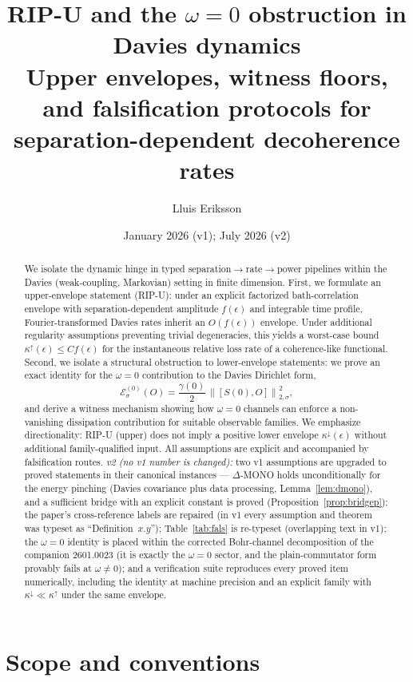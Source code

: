 \documentclass[11pt]{article}
\title{RIP-U and the $\omega = 0$ obstruction in Davies dynamics\\
\large Upper envelopes, witness floors, and falsification protocols for
separation-dependent decoherence rates}
\author{Lluis Eriksson}
\date{January 2026 (v1); July 2026 (v2)}
\theoremstyle{definition}
\theoremstyle{remark}
\begin{document}
\maketitle

\begin{abstract}
We isolate the dynamic hinge in typed separation$\to$rate$\to$power
pipelines within the Davies (weak-coupling, Markovian) setting in finite
dimension. First, we formulate an upper-envelope statement (RIP-U): under
an explicit factorized bath-correlation envelope with
separation-dependent amplitude $f(\epsilon)$ and integrable time profile,
Fourier-transformed Davies rates inherit an $O(f(\epsilon))$ envelope.
Under additional regularity assumptions preventing trivial degeneracies,
this yields a worst-case bound $\kappa^{\uparrow}(\epsilon) \le
Cf(\epsilon)$ for the instantaneous relative loss rate of a coherence-like
functional. Second, we isolate a structural obstruction to lower-envelope
statements: we prove an exact identity for the $\omega = 0$ contribution
to the Davies Dirichlet form,
\[
\mathcal{E}^{(0)}_{\sigma}(O) = \frac{\gamma(0)}{2}\,
\left\| [S(0), O] \right\|_{2,\sigma}^{2},
\]
and derive a witness mechanism showing how $\omega = 0$ channels can
enforce a non-vanishing dissipation contribution for suitable observable
families. We emphasize directionality: RIP-U (upper) does not imply a
positive lower envelope $\kappa^{\downarrow}(\epsilon)$ without additional
family-qualified input. All assumptions are explicit and accompanied by
falsification routes. \emph{v2 (no v1 number is changed):} two v1
assumptions are upgraded to proved statements in their canonical
instances --- $\Delta$-MONO holds unconditionally for the energy pinching
(Davies covariance plus data processing, Lemma~\ref{lem:dmono}), and a
sufficient bridge with an explicit constant is proved
(Proposition~\ref{prop:bridgep}); the paper's cross-reference labels are
repaired (in v1 every assumption and theorem was typeset as
``Definition~$x.y$''); Table~\ref{tab:fals} is re-typeset (overlapping
text in v1); the $\omega=0$ identity is placed within the corrected
Bohr-channel decomposition of the companion 2601.0023 (it is exactly the
$\omega=0$ sector, and the plain-commutator form provably fails at
$\omega \ne 0$); and a verification suite reproduces every proved item
numerically, including the identity at machine precision and an explicit
family with $\kappa^{\downarrow} \ll \kappa^{\uparrow}$ under the same
envelope.
\end{abstract}

\section{Scope and conventions}
\end{document}
